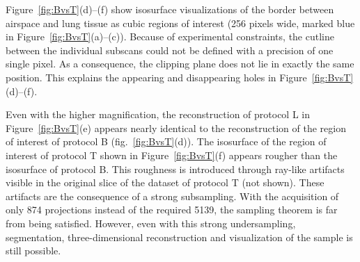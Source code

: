 \documentclass[preprint,s]{iucr}
\begin{document}
Figure~\ref{fig:BvsT}(d)--(f) show isosurface visualizations of the border between airspace and lung tissue as cubic regions of interest (256 pixels wide, marked blue in Figure~\ref{fig:BvsT}(a)--(c)). Because of experimental constraints, the cutline between the individual subscans could not be defined with a precision of one single pixel. As a consequence, the clipping plane does not lie in exactly the same position. This explains the appearing and disappearing holes in Figure~\ref{fig:BvsT}(d)--(f).

Even with the higher magnification, the reconstruction of protocol L in Figure~\ref{fig:BvsT}(e) appears nearly identical to the reconstruction of the region of interest of protocol B (fig.~\ref{fig:BvsT}(d)). The isosurface of the region of interest of protocol T shown in Figure~\ref{fig:BvsT}(f) appears rougher than the isosurface of protocol B. This roughness is introduced through ray-like artifacts visible in the original slice of the dataset of protocol T (not shown). These artifacts are the consequence of a strong subsampling. With the acquisition of only 874 projections instead of the required 5139, the sampling theorem is far from being satisfied. However, even with this strong undersampling, segmentation, three-dimensional reconstruction and visualization of the sample is still possible.
\end{document}
